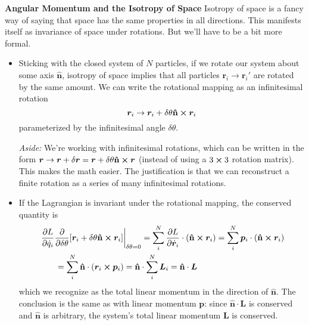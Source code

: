 \documentclass[11pt, a4paper]{article}
\newcommand{\bdot}[1]{\dot{\bm{#1}}} %
\newcommand{\uvec}[1]{\bm{\hat{\mathbf{#1}}}} %
\begin{document}
\textbf{Angular Momentum and the Isotropy of Space}
Isotropy of space is a fancy way of saying that space has the same properties in all directions. This manifests itself as invariance of space under rotations. But we'll have to be a bit more formal.
\begin{itemize}

	\item Sticking with the closed system of $ N $ particles, if we rotate our system about some axis $ \uvec{n} $, isotropy of space implies that all particles $ \bm{r}_{i} \to \bm{r}_{i}' $ are rotated by the same amount. We can write the rotational mapping as an infinitesimal rotation
	\begin{equation*}
		\bm{r}_{i} \to \bm{r}_{i} + \delta \theta \uvec{n} \cross \bm{r}_{i}
	\end{equation*}
	parameterized by the infinitesimal angle $ \delta \theta $. 
	
	\textit{Aside:} We're working with infinitesimal rotations, which can be written in the form $ \bm{r} \to \bm{r} + \delta \bm{r} = \bm{r} +  \delta \theta \uvec{n} \cross \bm{r} $ (instead of using a $ 3 \cross 3 $ rotation matrix). This makes the math easier. The justification is that we can reconstruct a finite rotation as a series of many infinitesimal rotations.
	
	\item If the Lagrangian is invariant under the rotational mapping, the conserved quantity is
	\begin{align*}
		&\eval{\pdv{L}{\dot{q}_{i}} \pdv{}{\delta \theta}[\bm{r}_{i} + \delta \theta \uvec{n} \cross \bm{r}_{i}]}_{\delta \theta=0} = \sum_{i}^{N} \pdv{L}{\bdot{r}_{i}} \cdot (\uvec{n} \cross \bm{r}_{i}) =  \sum_{i}^{N} \bm{p}_{i} \cdot (\uvec{n} \cross \bm{r}_{i})\\
		&{}\qquad=  \sum_{i}^{N} \uvec{n} \cdot ( \bm{r}_{i} \cross \bm{p}_{i}) =  \uvec{n} \cdot \sum_{i}^{N}  \bm{L}_{i} = \uvec{n} \cdot \bm{L}
	\end{align*}
	which we recognize as the total linear momentum in the direction of $ \uvec{n} $. The conclusion is the same as with linear momentum $ \bm{p} $: since $ \uvec{n} \cdot \bm{L} $ is conserved and $ \uvec{n} $ is arbitrary, the system's total linear momentum $ \bm{L} $ is conserved.
	
\end{itemize}
\end{document}
